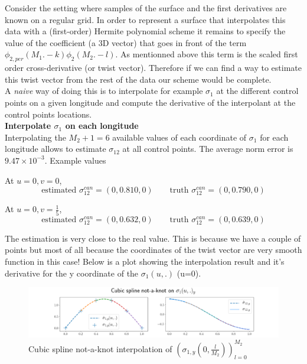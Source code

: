 \documentclass[a4paper, 11pt]{article}
\begin{document}
Consider the setting where samples of the surface and the first derivatives are known on a regular grid. In order to 
represent a surface that interpolates this data with a (first-order) Hermite polynomial scheme it remains to specify the 
value of the coefficient (a 3D vector) that goes in front of the term $\phi_{2, per}(M_1.-k)\phi_{2}(M_2.-l)$. As 
mentionned above this term is the scaled first order cross-derivative (or twist vector). Therefore if we can find a way 
to estimate this twist vector from the rest of the data our scheme would be complete. \\

A \emph{naive} way of doing this is to interpolate for example $\sigma_1$ at the different control points on a given 
longitude and compute the derivative of the interpolant at the control points locations. \\

\textbf{Interpolate $\sigma_1$ on each longitude} \mbox{} \\

Interpolating the $M_2+1=6$ available values of each coordinate of $\sigma_1$ for each longitude allows to estimate 
$\sigma_{12}$ at all control points. The average norm error is $9.47\times 10^{-3}$. Example values 

At $u=0, v=0$,
\begin{equation*}
  \text{estimated } \sigma_{12}^{can} = (0, 0.810, 0) \qquad \text{truth } \sigma_{12}^{can} = (0, 0.790, 0) 
\end{equation*}

At $u=0, v=\frac{1}{5}$,
\begin{equation*}
  \text{estimated } \sigma_{12}^{can} = (0, 0.632, 0) \qquad \text{truth } \sigma_{12}^{can} = (0, 0.639, 0) 
\end{equation*}

The estimation is very close to the real value. This is because we have a couple of points but most of all because the 
coordinates of the twist vector are very smooth function in this case! Below is a plot showing the interpolation result 
and it's derivative for the y coordinate of the $\sigma_1(u,.)$ (u=0). 
 
\begin{figure}[h!]
  \includegraphics[width=\textwidth]{cubic_sigma_1.png}
  \caption{Cubic spline not-a-knot interpolation of ${\left(\sigma_{1,y}(0,\frac{l}{M_2})\right)}_{l=0}^{M_2}$}
\end{figure}
\end{document}
